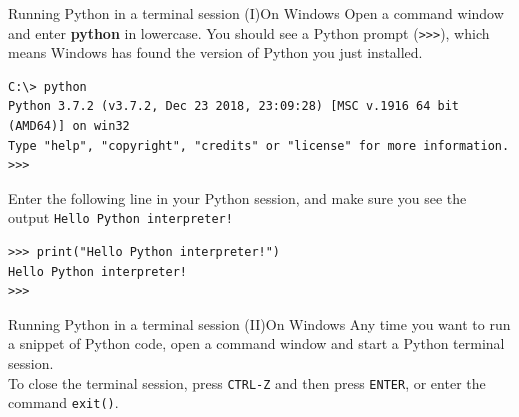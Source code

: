 \documentclass[aspectratio=169]{beamer}
\begin{document}
\begin{frame}[fragile]{Running Python in a terminal session (I)}{On Windows}
    Open a command window and enter \textbf{python} in lowercase.
    You should see a Python prompt (\verb|>>>|), which means Windows has found the version of Python you just installed.
    \vspace{10pt}
    \begin{Verbatim}[fontsize=\footnotesize]
C:\> python
Python 3.7.2 (v3.7.2, Dec 23 2018, 23:09:28) [MSC v.1916 64 bit (AMD64)] on win32
Type "help", "copyright", "credits" or "license" for more information.
>>>
    \end{Verbatim}
    \vspace{10pt}
    Enter the following line in your Python session, and make sure you see the output \texttt{Hello Python interpreter!}
    \vspace{10pt}
    \begin{Verbatim}[fontsize=\footnotesize]
>>> print("Hello Python interpreter!")
Hello Python interpreter!
>>>
    \end{Verbatim}
\end{frame}


\begin{frame}[fragile]{Running Python in a terminal session (II)}{On Windows}
    Any time you want to run a snippet of Python code, open a command window and start a Python terminal session. \\
    \vspace{10pt}
    To close the terminal session, press \texttt{CTRL-Z} and then press \texttt{ENTER}, or enter the command \texttt{exit()}.
\end{frame}


\end{document}
